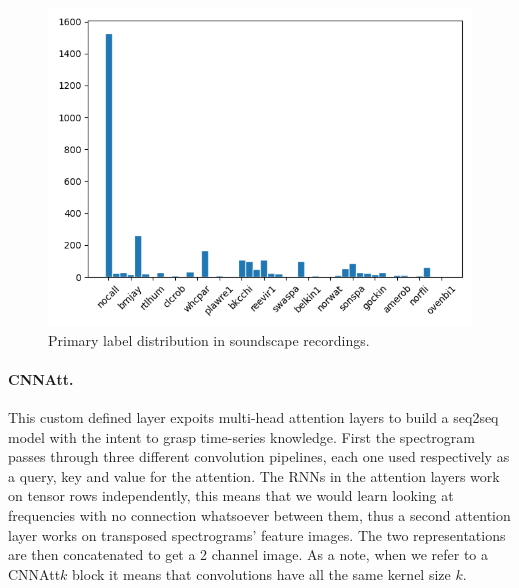\documentclass{article}
\begin{document}
\begin{figure}
    \centering
    \includegraphics[scale=.35]{images/soundscapes_distribution_birds.png}
    \caption{Primary label distribution in soundscape recordings.}
    \label{fig:soundscapes_classification_freq}
\end{figure}

\paragraph*{CNNAtt.}
This custom defined layer expoits multi-head attention layers to build a seq2seq model with the intent to grasp time-series knowledge.
First the spectrogram passes through three different convolution pipelines, each one used respectively as a query, key and value for the attention.
The RNNs in the attention layers work on tensor rows independently, this means that we would learn looking at frequencies with no connection whatsoever between them, thus a second attention layer works on transposed spectrograms' feature images.
The two representations are then concatenated to get a 2 channel image.
As a note, when we refer to a CNNAtt$k$ block it means that convolutions have all the same kernel size $k$.
\end{document}
